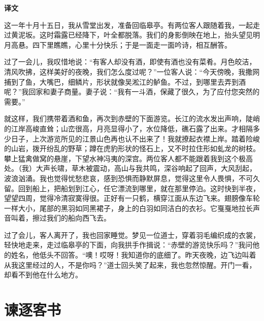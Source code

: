 \documentclass[12pt,UTF-8,openany,a4]{ctexbook}
\begin{document}
\newpage

\begin{Large}
    \noindent\textbf{译文}
\end{Large}


\vspace{1em}

\begin{large}
    \yiwen 
    这一年十月十五日，我从雪堂出发，准备回临皋亭。有两位客人跟随着我，一起走过黄泥坂。这时霜露已经降下，叶全都脱落。我们的身影倒映在地上，抬头望见明月高悬。四下里瞧瞧，心里十分快乐；于是一面走一面吟诗，相互酬答。
    
    过了一会儿，我叹惜地说：“有客人却没有酒，即使有酒也没有菜肴。月色皎洁，清风吹拂，这样美好的夜晚，我们怎么度过呢？”一位客人说：“今天傍晚，我撒网捕到了鱼，大嘴巴，细鳞片，形状就像吴淞江的鲈鱼。不过，到哪里去弄到酒呢？”我回家和妻子商量。妻子说：“我有一斗酒，保藏了很久，为了应付您突然的需要。”
    
    就这样，我们携带着酒和鱼，再次到赤壁的下面游览。长江的流水发出声响，陡峭的江岸高峻直耸；山峦很高，月亮显得小了，水位降低，礁石露了出来。才相隔多少日子，上次游览所见的江景山色再也认不出来了！我就撩起衣襟上岸。踏着险峻的山岩，拨开纷乱的野草；蹲在虎豹形状的怪石上，又不时拉住形如虬龙的树枝。攀上猛禽做窝的悬崖，下望水神冯夷的深宫。两位客人都不能跟着我到这个极高处。（我）大声长啸，草木被震动，高山与我共鸣，深谷响起了回声，大风刮起，波浪汹涌。我也觉得忧愁悲哀，感到恐惧而静默屏息，觉得这里令人畏惧，不可久留。回到船上，把船划到江心，任它漂流到哪里，就在那里停泊。这时快到半夜，望望四周，觉得冷清寂寞得很。正好有一只鹤，横穿江面从东边飞来。翅膀像车轮一样大小，尾部的黑羽如同黑裙子，身上的白羽如同洁白的衣衫。它戛戛地拉长声音叫着，擦过我们的船向西飞去。
    
    过了会儿，客人离开了，我也回家睡觉。梦见一位道士，穿着羽毛编织成的衣裳，轻快地走来，走过临皋亭的下面，向我拱手作揖说：“赤壁的游览快乐吗？”我问他的姓名，他低头不回答。“噢！哎呀！我知道你的底细了。昨天夜晚，边飞边叫着从我这里经过的人，不是你吗？”道士回头笑了起来，我也忽然惊醒。开门一看，却看不到他在什么地方。
    
\end{large}


\chapter{谏逐客书}
\end{document}
